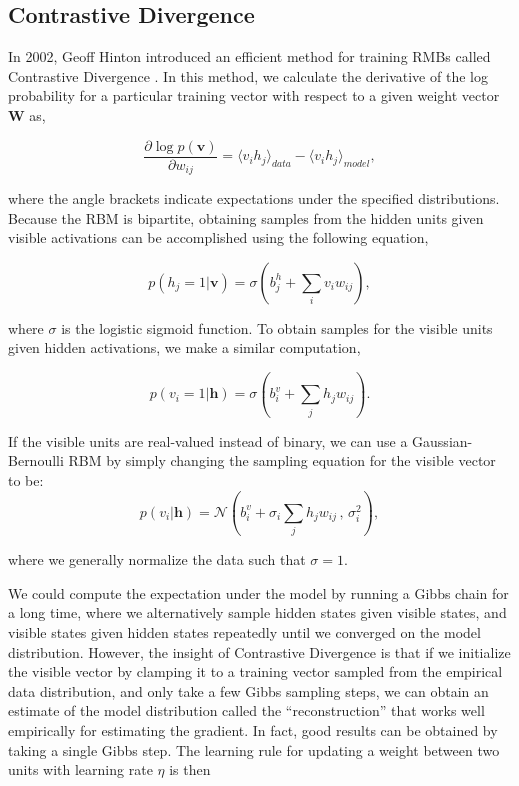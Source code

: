 \documentclass{article}
\begin{document}
\subsection{Contrastive Divergence}

In 2002, Geoff Hinton introduced an efficient method for training RMBs called
Contrastive Divergence \cite{hinton_contrastivedivergence, Hinton06afast}. In
this method, we calculate the derivative of the log probability for a particular
training vector with respect to a given weight vector $\mathbf{W}$ as,

\begin{equation}
  \label{eq:cd}
  \frac{\partial \log p(\mathbf{v})}{\partial w_{ij}} = 
  \langle v_i h_j \rangle_{data} - \langle v_i h_j \rangle_{model},
\end{equation}

where the angle brackets indicate expectations under the specified
distributions.  Because the RBM is bipartite, obtaining samples from the hidden
units given visible activations can be accomplished using the following
equation,

\[
  p (h_j = 1 | \mathbf{v}) = \sigma\left(b_{j}^{h} + \sum_i v_{i} w_{ij}\right),
\]

where $\sigma$ is the logistic sigmoid function. To obtain samples for the
visible units given hidden activations, we make a similar computation,

\[
  p (v_i = 1 | \mathbf{h}) = \sigma\left(b_{i}^{v} + \sum_j h_j w_{ij}\right).
\]


If the visible units are real-valued instead of binary, we can use a
Gaussian-Bernoulli RBM by simply changing the sampling equation for the visible
vector to be:
\[
  p (v_i | \mathbf{h}) = \mathcal{N} \left( b_{i}^{v} +
    \sigma_i \sum_j h_j w_{ij} \,,\, \sigma_i^2 \right),
\]

where we generally normalize the data such that $\sigma = 1$.

We could compute the expectation under the model by running a Gibbs chain for a
long time, where we alternatively sample hidden states given visible states,
and visible states given hidden states repeatedly until we converged on the
model distribution. However, the insight of Contrastive Divergence is that if
we initialize the visible vector by clamping it to a training vector sampled
from the empirical data distribution, and only take a few Gibbs sampling steps,
we can obtain an estimate of the model distribution called the
``reconstruction'' that works well empirically for estimating the gradient. In
fact, good results can be obtained by taking a single Gibbs step.  The learning
rule for updating a weight between two units with learning rate $\eta$ is then
\end{document}
